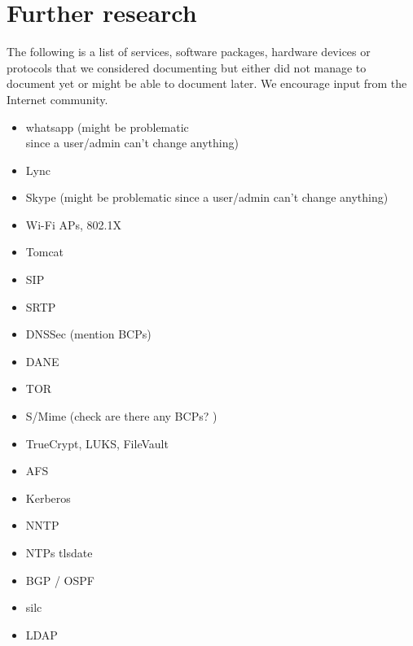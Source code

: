 \section{Further research}

The following is a list of services, software packages, hardware devices or protocols that we considered documenting but either did not manage to document yet or might be able to document later. We encourage input from the Internet community. 

\vline{}

\begin{minipage}[b]{0.5\linewidth}
\begin{itemize}
\item whatsapp (might be problematic\\ since a user/admin can't change anything)
\item Lync
\item Skype (might be problematic since a user/admin can't change anything)
\item Wi-Fi APs, 802.1X
\item Tomcat
\item SIP 
\item SRTP 
\item DNSSec (mention BCPs) 
\item DANE
\item TOR 
\item S/Mime (check are there any BCPs? )
\item TrueCrypt, LUKS, FileVault
\item AFS 
\item Kerberos 
\item NNTP 
\item NTPs tlsdate 
\item BGP / OSPF 
\item silc 
\item LDAP 
\end{itemize}
\end{minipage}
